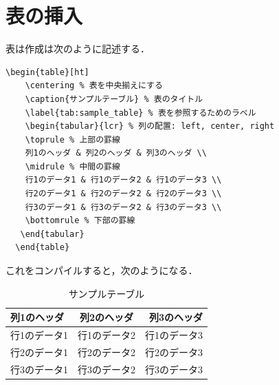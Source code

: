 \documentclass[../main/main]{subfiles}
\begin{document}
\section{表の挿入}
表は作成は次のように記述する．
\begin{lstlisting}[language={[latex]TeX}]
  \begin{table}[ht]
    \centering % 表を中央揃えにする
    \caption{サンプルテーブル} % 表のタイトル
    \label{tab:sample_table} % 表を参照するためのラベル
    \begin{tabular}{lcr} % 列の配置: left, center, right
    \toprule % 上部の罫線
    列1のヘッダ & 列2のヘッダ & 列3のヘッダ \\
    \midrule % 中間の罫線
    行1のデータ1 & 行1のデータ2 & 行1のデータ3 \\
    行2のデータ1 & 行2のデータ2 & 行2のデータ3 \\
    行3のデータ1 & 行3のデータ2 & 行3のデータ3 \\
    \bottomrule % 下部の罫線
   \end{tabular}
  \end{table}
\end{lstlisting}
これをコンパイルすると，次のようになる．
\begin{table}[ht]
  \centering %
  \caption{サンプルテーブル} %
  \label{tab:sample_table} %
  \begin{tabular}{lcr} %
  \toprule %
  列1のヘッダ & 列2のヘッダ & 列3のヘッダ \\
  \midrule %
  行1のデータ1 & 行1のデータ2 & 行1のデータ3 \\
  行2のデータ1 & 行2のデータ2 & 行2のデータ3 \\
  行3のデータ1 & 行3のデータ2 & 行3のデータ3 \\
  \bottomrule %
 \end{tabular}
\end{table}

\newpage
\end{document}
